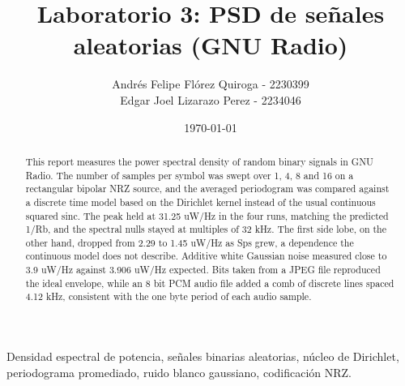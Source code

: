 \documentclass[twocolumn]{IEEEtran}
\newcommand{\dochead}{Laboratorio 3}
\newcommand{\docsubhead}{PSD de señales aleatorias (GNU Radio)}
\newcommand{\titulo}{\dochead: \docsubhead}
\begin{document}
  


\title{\vspace{1cm}\textbf{\titulo}}            %

\author{
Andrés Felipe Flórez Quiroga - 2230399 \\
Edgar Joel Lizarazo Perez - 2234046
}

\date{\today}

\maketitle                          %
\thispagestyle{fancy}               %


\renewcommand{\abstractname}{Abstract}
\begin{abstract}
This report measures the power spectral density of random binary signals in GNU Radio. The number of samples per symbol was swept over 1, 4, 8 and 16 on a rectangular bipolar NRZ source, and the averaged periodogram was compared against a discrete time model based on the Dirichlet kernel instead of the usual continuous squared sinc. The peak held at 31.25 uW/Hz in the four runs, matching the predicted 1/Rb, and the spectral nulls stayed at multiples of 32 kHz. The first side lobe, on the other hand, dropped from 2.29 to 1.45 uW/Hz as Sps grew, a dependence the continuous model does not describe. Additive white Gaussian noise measured close to 3.9 uW/Hz against 3.906 uW/Hz expected. Bits taken from a JPEG file reproduced the ideal envelope, while an 8 bit PCM audio file added a comb of discrete lines spaced 4.12 kHz, consistent with the one byte period of each audio sample.
\end{abstract}

\begin{IEEEkeywords}
Densidad espectral de potencia, señales binarias aleatorias, núcleo de Dirichlet, periodograma promediado, ruido blanco gaussiano, codificación NRZ.
\end{IEEEkeywords}
\end{document}
